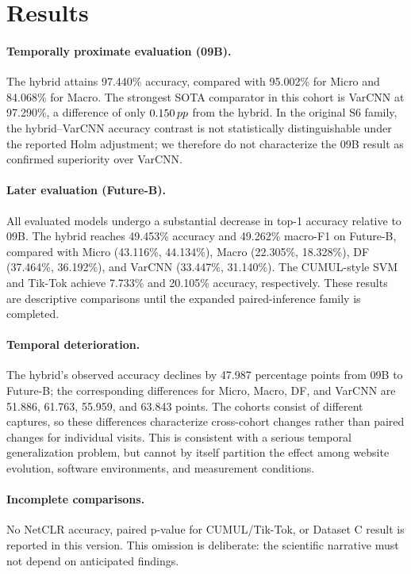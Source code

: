 \section{Results}\label{sec:results}

\paragraph{Temporally proximate evaluation (09B).} The hybrid attains 97.440\% accuracy, compared with 95.002\% for Micro and 84.068\% for Macro. The strongest SOTA comparator in this cohort is VarCNN at 97.290\%, a difference of only $0.150\,pp$ from the hybrid. In the original S6 family, the hybrid--VarCNN accuracy contrast is not statistically distinguishable under the reported Holm adjustment; we therefore do not characterize the 09B result as confirmed superiority over VarCNN.

\paragraph{Later evaluation (Future-B).} All evaluated models undergo a substantial decrease in top-1 accuracy relative to 09B. The hybrid reaches 49.453\% accuracy and 49.262\% macro-F1 on Future-B, compared with Micro (43.116\%, 44.134\%), Macro (22.305\%, 18.328\%), DF (37.464\%, 36.192\%), and VarCNN (33.447\%, 31.140\%). The CUMUL-style SVM and Tik-Tok achieve 7.733\% and 20.105\% accuracy, respectively. These results are descriptive comparisons until the expanded paired-inference family is completed.

\paragraph{Temporal deterioration.} The hybrid's observed accuracy declines by 47.987 percentage points from 09B to Future-B; the corresponding differences for Micro, Macro, DF, and VarCNN are 51.886, 61.763, 55.959, and 63.843 points. The cohorts consist of different captures, so these differences characterize cross-cohort changes rather than paired changes for individual visits. This is consistent with a serious temporal generalization problem, but cannot by itself partition the effect among website evolution, software environments, and measurement conditions.

\paragraph{Incomplete comparisons.} No NetCLR accuracy, paired p-value for CUMUL/Tik-Tok, or Dataset C result is reported in this version. This omission is deliberate: the scientific narrative must not depend on anticipated findings.

